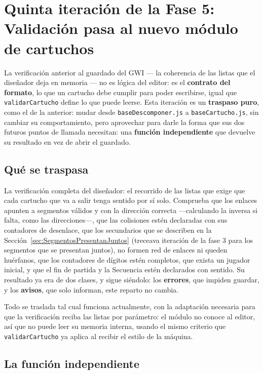 \section{Quinta iteración de la Fase 5: Validación pasa al nuevo módulo de cartuchos}
\label{sec:F5I5}

La verificación anterior al guardado del GWI — la coherencia
de las listas que el diseñador deja en memoria — no es lógica del
editor: es el \textbf{contrato del formato}, lo que un cartucho
debe cumplir para poder escribirse, igual que \texttt{validarCartucho}
define lo que puede leerse. Esta iteración es un
\textbf{traspaso puro}, como el de la anterior: mudar desde 
\texttt{baseDescomponer.js} a \texttt{baseCartucho.js}, sin cambiar
su comportamiento, pero aprovechar para darle la forma que sus dos
futuros puntos de llamada necesitan: una \textbf{función independiente}
que devuelve su resultado en vez de abrir el guardado.

\subsection{Qué se traspasa}
\label{sec:F5I5Que}

La verificación completa del diseñador: el recorrido de las
listas que exige que cada cartucho que va a salir tenga sentido
por sí solo. Comprueba que los enlaces apunten a segmentos
válidos y con la dirección correcta —calculando la inversa si
falta, como las direcciones—, que las colisiones estén declaradas
con sus contadores de desenlace, que los secundarios que se describen en la 
Sección~\ref{sec:SegmentosPresentanJuntos} (treceava iteración de la fase 3 para los
segmentos que se presentan juntos), no formen red de enlaces ni queden huérfanos,
que los contadores de dígitos estén completos, que exista un
jugador inicial, y que el fin de partida y la Secuencia estén
declarados con sentido. Su resultado ya era de dos clases, y
sigue siéndolo: los \textbf{errores}, que impiden guardar, y los
\textbf{avisos}, que solo informan, este reparto no cambia.

Todo se traslada tal cual funciona actualmente, con la adaptación necesaria para
que la verificación reciba las listas por parámetro: el módulo
no conoce al editor, así que no puede leer su memoria interna, usando 
el mismo criterio que \texttt{validarCartucho} ya aplica al
recibir el estilo de la máquina.

\subsection{La función independiente}
\label{sec:F5I5Funcion}

